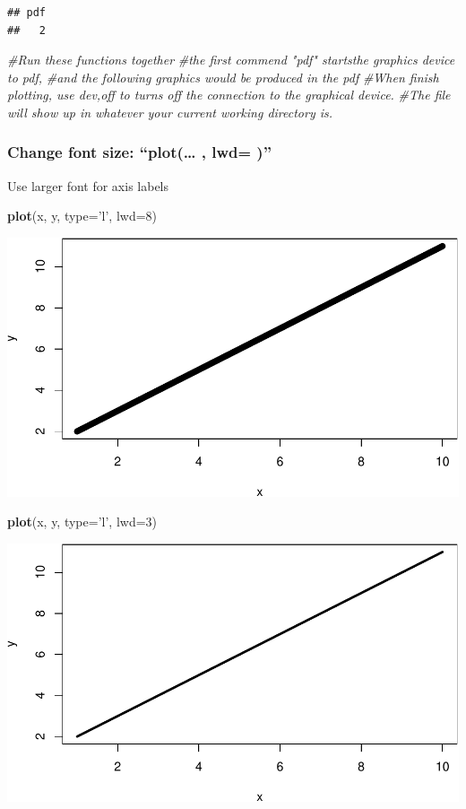 \documentclass[]{article}
\newenvironment{Shaded}{\begin{snugshade}}{\end{snugshade}}
\newcommand{\CommentTok}[1]{\textcolor[rgb]{0.56,0.35,0.01}{\textit{#1}}}
\newcommand{\DataTypeTok}[1]{\textcolor[rgb]{0.13,0.29,0.53}{#1}}
\newcommand{\DecValTok}[1]{\textcolor[rgb]{0.00,0.00,0.81}{#1}}
\newcommand{\KeywordTok}[1]{\textcolor[rgb]{0.13,0.29,0.53}{\textbf{#1}}}
\newcommand{\NormalTok}[1]{#1}
\newcommand{\StringTok}[1]{\textcolor[rgb]{0.31,0.60,0.02}{#1}}
\begin{document}
\begin{verbatim}
## pdf 
##   2
\end{verbatim}

\begin{Shaded}
\begin{Highlighting}[]
  \CommentTok{#Run these functions together}
  \CommentTok{#the first commend "pdf" startsthe graphics device to pdf, }
  \CommentTok{#and the following graphics would be produced in the pdf  }
  \CommentTok{#When finish plotting, use dev,off to turns off the connection to the graphical device.}
  \CommentTok{#The file will show up in whatever your current working directory is.}
\end{Highlighting}
\end{Shaded}

\hypertarget{change-font-size-plot-lwd}{%
\subsubsection{Change font size: ``plot(\ldots{} , lwd=
)''}\label{change-font-size-plot-lwd}}

Use larger font for axis labels

\begin{Shaded}
\begin{Highlighting}[]
\KeywordTok{plot}\NormalTok{(x, y, }\DataTypeTok{type=}\StringTok{'l'}\NormalTok{, }\DataTypeTok{lwd=}\DecValTok{8}\NormalTok{)}
\end{Highlighting}
\end{Shaded}

\includegraphics[width=0.5\linewidth]{tutorial_files/figure-latex/unnamed-chunk-34-1}

\begin{Shaded}
\begin{Highlighting}[]
\KeywordTok{plot}\NormalTok{(x, y, }\DataTypeTok{type=}\StringTok{'l'}\NormalTok{, }\DataTypeTok{lwd=}\DecValTok{3}\NormalTok{)}
\end{Highlighting}
\end{Shaded}

\includegraphics[width=0.5\linewidth]{tutorial_files/figure-latex/unnamed-chunk-34-2}
\end{document}
